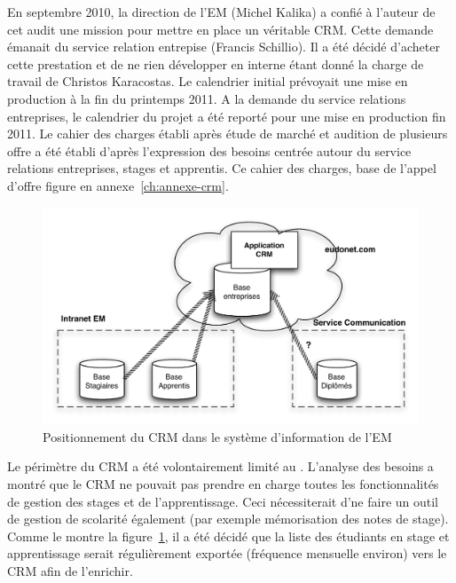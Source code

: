 \documentclass{book}
\begin{document}
En septembre 2010, la direction de l'EM (Michel Kalika) a confié
à l'auteur de cet audit une mission pour mettre en place un véritable
CRM. Cette demande émanait du service relation entrepise (Francis 
Schillio). Il a été décidé d'acheter cette prestation et de ne rien 
développer en interne étant donné la charge de travail de Christos 
Karacostas. Le calendrier initial prévoyait une mise en production 
à la fin du printemps 2011. A la demande du service relations 
entreprises, le calendrier du projet a été reporté pour une mise en 
production fin 2011.
Le cahier des charges établi après étude de marché et audition de
plusieurs offre a été établi d'après l'expression des besoins
centrée autour du service relations entreprises, stages et apprentis.
Ce cahier des charges, base de l'appel d'offre figure en annexe~\ref{ch:annexe-crm}.\\

\begin{figure}[hbt]
\begin{center}
\includegraphics[width=.9\linewidth]{figs/crm_overview.pdf}
\end{center}
\caption{Positionnement du CRM dans le système d'information de l'EM}
\label{fg:crm_overview}
\end{figure}

Le périmètre du CRM  a été volontairement limité au \sre. L'analyse 
des besoins a montré que le CRM ne pouvait pas prendre en charge 
toutes les fonctionnalités de gestion des stages et de l'apprentissage. 
Ceci nécessiterait d'ne faire un outil de gestion de scolarité également
(par exemple mémorisation des notes de stage). Comme le montre la 
figure~\ref{fg:crm_overview}, il a été décidé que la liste des étudiants 
en stage et apprentissage serait régulièrement exportée (fréquence 
mensuelle environ) vers le CRM afin de l'enrichir.\\
\end{document}
